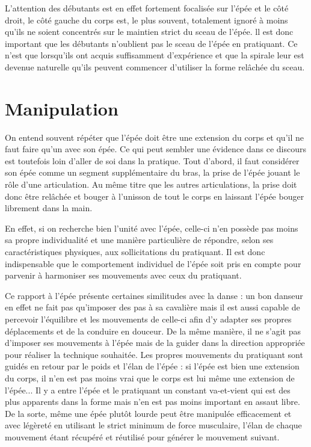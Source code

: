L'attention des débutants est en effet fortement focalisée sur l'épée et le côté droit, le côté gauche du corps est, le plus souvent, totalement ignoré à moins qu'ils ne soient concentrés sur le maintien strict du sceau de l'épée.
ll est donc important que les débutants n'oublient pas le sceau de l'épée en pratiquant. Ce n'est que lorsqu'ils ont acquis suffisamment d'expérience et que la spirale leur est devenue naturelle qu'ils peuvent commencer d'utiliser la forme relâchée du sceau.

\section{Manipulation}
On entend souvent répéter que l'épée doit être une extension du corps et qu'il ne faut faire qu'un avec son épée.
Ce qui peut sembler une évidence dans ce discours est toutefois loin d'aller de soi dans la pratique.
Tout d'abord, il faut considérer son épée comme un segment supplémentaire du bras, la prise de l'épée jouant le rôle d'une articulation.
Au même titre que les autres articulations, la prise doit donc être relâchée et bouger à l'unisson de tout le corps en laissant l'épée bouger librement dans la main.

En effet, si on recherche bien l'unité avec l'épée, celle-ci n'en possède pas moins sa propre individualité et une manière particulière de répondre, selon ses caractéristiques physiques, aux sollicitations du pratiquant.
Il est donc indispensable que le comportement individuel de l'épée soit pris en compte pour parvenir à harmoniser ses mouvements avec ceux du pratiquant.

Ce rapport à l'épée présente certaines similitudes avec la danse : un bon danseur en effet ne fait pas qu'imposer des pas à sa cavalière mais il est aussi capable de percevoir l'équilibre et les mouvements de celle-ci afin d'y adapter ses propres déplacements et de la conduire en douceur.
De la même manière, il ne s'agit pas d'imposer ses mouvements à l'épée mais de la guider dans la direction appropriée pour réaliser la technique souhaitée.
Les propres mouvements du pratiquant sont guidés en retour par le poids et l'élan de l'épée : si l'épée est bien une extension du corps, il n'en est pas moins vrai que le corps est lui même une extension de l'épée...
Il y a entre l'épée et le pratiquant un constant va-et-vient qui est des plus apparents dans la forme mais n'en est pas moins important en assaut libre.
De la sorte, même une épée plutôt lourde peut être manipulée efficacement et avec légèreté en utilisant le strict minimum de force musculaire, l'élan de chaque mouvement étant récupéré et réutilisé pour générer le mouvement suivant.

